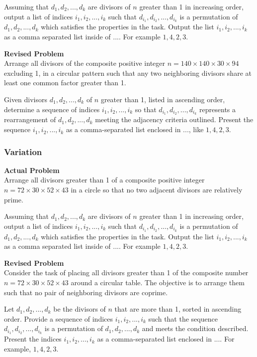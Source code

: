 Assuming that $d_1, d_2, ..., d_k$ are divisors of $n$ greater than 1 in increasing order, output a list of indices $i_1, i_2, ..., i_k$ such that $d_{i_1}, d_{i_2}, ..., d_{i_k}$ is a permutation of $d_1, d_2, ..., d_k$ which satisfies the properties in the task.
Output the list $i_1, i_2, ..., i_k$ as a comma separated list inside of $\boxed{...}$. For example $\boxed{1, 4, 2, 3}$.

\textbf{Revised Problem}\\
Arrange all divisors of the composite positive integer $n = 140 \times 140 \times 30 \times 94$ excluding 1, in a circular pattern such that any two neighboring divisors share at least one common factor greater than 1.

Given divisors $d_1, d_2, ..., d_k$ of $n$ greater than 1, listed in ascending order, determine a sequence of indices $i_1, i_2, ..., i_k$ so that $d_{i_1}, d_{i_2}, ..., d_{i_k}$ represents a rearrangement of $d_1, d_2, ..., d_k$ meeting the adjacency criteria outlined. Present the sequence $i_1, i_2, ..., i_k$ as a comma-separated list enclosed in $\boxed{...}$, like $\boxed{1, 4, 2, 3}$.

\subsubsection{Variation}
\textbf{Actual Problem}\\
Arrange all divisors greater than 1 of a composite positive integer $n = 72 \times 30 \times 52 \times 43$ in a circle so that no two adjacent divisors are relatively prime.

Assuming that $d_1, d_2, ..., d_k$ are divisors of $n$ greater than 1 in increasing order, output a list of indices $i_1, i_2, ..., i_k$ such that $d_{i_1}, d_{i_2}, ..., d_{i_k}$ is a permutation of $d_1, d_2, ..., d_k$ which satisfies the properties in the task.
Output the list $i_1, i_2, ..., i_k$ as a comma separated list inside of $\boxed{...}$. For example $\boxed{1, 4, 2, 3}$.

\textbf{Revised Problem}\\
Consider the task of placing all divisors greater than 1 of the composite number $n = 72 \times 30 \times 52 \times 43$ around a circular table. The objective is to arrange them such that no pair of neighboring divisors are coprime.

Let $d_1, d_2, ..., d_k$ be the divisors of $n$ that are more than 1, sorted in ascending order. Provide a sequence of indices $i_1, i_2, ..., i_k$ such that the sequence $d_{i_1}, d_{i_2}, ..., d_{i_k}$ is a permutation of $d_1, d_2, ..., d_k$ and meets the condition described. Present the indices $i_1, i_2, ..., i_k$ as a comma-separated list enclosed in $\boxed{...}$. For example, $\boxed{1, 4, 2, 3}$.

